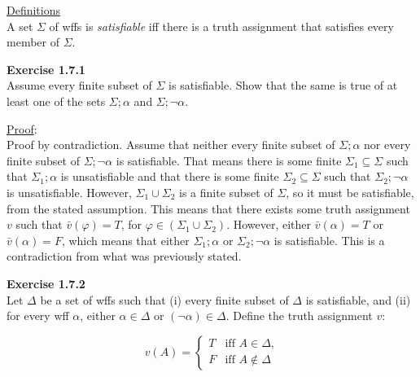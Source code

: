 \documentclass[12pt]{article}	%
\begin{document}

\begin{flushleft}

\underline{Definitions}\\
A set $\Sigma$ of wffs is \textit{satisfiable} iff there is a truth assignment that satisfies every member of $\Sigma$.\\

\vspace{10mm}

\textbf{Exercise 1.7.1} \\
Assume every finite subset of $\Sigma$ is satisfiable. Show that the same is true of at least one of the sets $\Sigma;\alpha$ and $\Sigma;\neg\alpha$. \\

\vspace{5mm}

\underline{Proof}: \\
Proof by contradiction. Assume that neither every finite subset of $\Sigma;\alpha$ nor every finite subset of $\Sigma;\neg\alpha$ is satisfiable. That means there is some finite $\Sigma_1 \subseteq \Sigma$ such that $\Sigma_1;\alpha$ is unsatisfiable and that there is some finite $\Sigma_2 \subseteq \Sigma$ such that $\Sigma_2;\neg\alpha$ is unsatisfiable. However, $\Sigma_1 \cup \Sigma_2$ is a finite subset of $\Sigma$, so it must be satisfiable, from the stated assumption. This means that there exists some truth assignment $v$ such that $\bar{v}(\varphi) = T$, for $\varphi \in (\Sigma_1 \cup \Sigma_2)$. However, either $\bar{v}(\alpha) = T$ or $\bar{v}(\alpha) = F$, which means that either $\Sigma_1;\alpha$ or $\Sigma_2;\neg\alpha$ is satisfiable. This is a contradiction from what was previously stated. \\

\vspace{10mm}

\textbf{Exercise 1.7.2} \\
Let $\Delta$ be a set of wffs such that (i) every finite subset of $\Delta$ is satisfiable, and (ii) for every wff $\alpha$, either $\alpha \in \Delta$ or $(\neg\alpha) \in \Delta$. Define the truth assignment $v$:

$$
v(A) = 
\begin{cases}
T & \text{iff $A \in \Delta$,}\\
F & \text{iff $A \notin \Delta$}
\end{cases}
$$


\end{flushleft}
\end{document}
